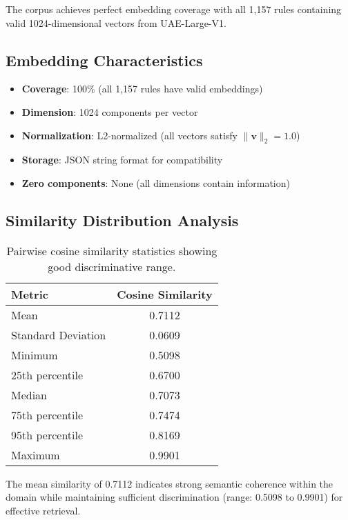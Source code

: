 The corpus achieves perfect embedding coverage with all 1,157 rules containing valid 1024-dimensional vectors from UAE-Large-V1.

\subsection{Embedding Characteristics}

\begin{itemize}[leftmargin=*,itemsep=2pt,topsep=2pt]
 \item \textbf{Coverage}: 100\% (all 1,157 rules have valid embeddings)
 \item \textbf{Dimension}: 1024 components per vector
 \item \textbf{Normalization}: L2-normalized (all vectors satisfy $\|\mathbf{v}\|_2 = 1.0$)
 \item \textbf{Storage}: JSON string format for compatibility
 \item \textbf{Zero components}: None (all dimensions contain information)
\end{itemize}

\subsection{Similarity Distribution Analysis}

\begin{table}[ht]
\centering
\begin{tabular}{lc}
\toprule
\textbf{Metric} & \textbf{Cosine Similarity} \\
\midrule
Mean & 0.7112 \\
Standard Deviation & 0.0609 \\
Minimum & 0.5098 \\
25th percentile & 0.6700 \\
Median & 0.7073 \\
75th percentile & 0.7474 \\
95th percentile & 0.8169 \\
Maximum & 0.9901 \\
\bottomrule
\end{tabular}
\caption{Pairwise cosine similarity statistics showing good discriminative range.}
\label{tab:similarity-stats}
\end{table}

The mean similarity of 0.7112 indicates strong semantic coherence within the domain while maintaining sufficient discrimination (range: 0.5098 to 0.9901) for effective retrieval.

